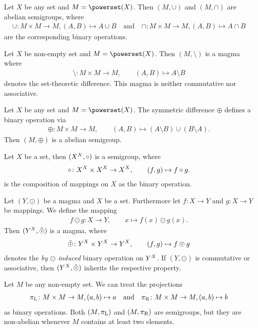 \begin{examples}
    \begin{exampleenumerate}
        \item Let $X$ be any set and $M=\powerset(X)$. Then $(M,\cup)$ and $(M,\cap)$ are abelian semigroups, where
        \begin{align}\cup\colon M\times M\to M, (A,B)\mapsto A\cup B\quad\text{and}\quad \cap\colon M\times M\to M, (A,B)\mapsto A\cap B\end{align}
        are the corresponding binary operations.
        \item Let $X$ be non-empty set and $M=\powerset(X)$. Then $(M,\setminus)$ is a magma where 
        \begin{align}\setminus\colon M\times M\to M, \qquad (A,B)\mapsto A\setminus B\end{align}
        denotes the set-theoretic difference. This magma is neither commutative nor associative.
        \item Let $X$ be any set and $M=\powerset(X)$. The symmetric difference $\oplus$ defines a binary operation via
        \begin{align}\oplus\colon M\times M\to M, \qquad (A,B)\mapsto (A\setminus B)\cup(B\setminus A).\end{align}
        Then $(M,\oplus)$ is a abelian semigroup.
        \item Let $X$ be a set, then $(\mapset X X,\circ)$ is a semigroup, where
        \begin{align}\circ\colon \mapset X X\times \mapset X X \to \mapset X X,\qquad (f,g)\mapsto f\circ g.\end{align}
        is the composition of mappings on $X$ as the binary operation.
        \item Let $(Y,\odot)$ be a magma and $X$ be a set. Furthermore let $f\colon X\to Y$ and $g\colon X\to Y$ be mappings. We define the mapping
        \begin{align}f\odot g\colon X\to Y,\qquad x\mapsto f(x)\odot g(x).\end{align}
        Then $(\mapset X Y,\tilde{\odot})$ is a magma, where
        \begin{align}\tilde{\odot}\colon \mapset X Y\times\mapset X Y\to \mapset X Y,\qquad (f,g)\mapsto f\odot g\end{align}
        denotes the \emph{by $\odot$ induced} binary operation on $\mapset X Y$. If $(Y,\odot)$ is commutative or associative, then $(\mapset X Y,\tilde{\odot})$ inherits the respective property.
        \item Let $M$ be any non-empty set. We can treat the projections
        \begin{align}\pi_{\rm L}\colon M\times M\to M, (a,b)\mapsto a \quad\text{and}\quad \pi_{\rm R}\colon M\times M\to M, (a,b)\mapsto b\end{align}
        as binary operations. Both $(M,\pi_{\rm L})$ and $(M,\pi_{\rm R})$ are semigroups, but they are non-abelian whenever $M$ contains at least two elements.
    \end{exampleenumerate}
\end{examples}


